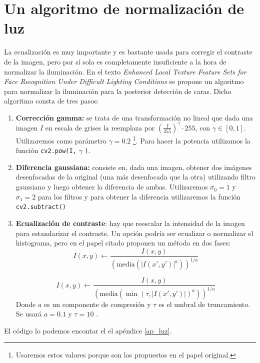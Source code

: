 \documentclass[a4paper,openright, 12pt]{book}
\begin{document}
\section{Un algoritmo de normalización de luz}
La ecualización es muy importante y es bastante usada para corregir el contraste de la imagen, pero por sí sola es completamente insuficiente a la hora de normalizar la iluminación. En el texto \textit{Enhanced Local Texture Feature Sets for Face Recognition Under Difficult Lighting Conditions} \cite{illuFace} se propone un algoritmo para normalizar la iluminación para la posterior detección de caras.
\newline
Dicho algoritmo consta de tres pasos:
\begin{enumerate}
\item \textbf{Corrección gamma:} 
se trata de una transformación no lineal que dada una imagen $I$ en escala de grises la reemplaza por ${(\frac{I}{255})}^{\gamma}\cdot255$, con $\gamma \in [0,1]$. Utilizaremos como parámetro $\gamma = 0.2$ \footnote{Usaremos estos valores porque son los propuestos en el papel original.}. Para hacer la potencia utilizamos la función \lstinline|cv2.pow(I,| $\gamma$ \lstinline|)|.

\item \textbf{Diferencia gaussiana:} consiste en, dada una imagen, obtener dos imágenes desenfocadas de la original (una más desenfocada que la otra) utilizando filtro gaussiano y luego obtener la diferencia de ambas. Utilizaremos $\sigma_0 =1$ y $\sigma_1=2$ para los filtros y para obtener la diferencia utilizaremos la función \lstinline|cv2.subtract()|

\item \textbf{Ecualización de contraste}: hay que reescalar la intensidad de la imagen para estandarizar el contraste. Un opción podría ser ecualizar o normalizar el histograma, pero en el papel citado proponen un método en dos fases:
\begin{equation}
I(x,y) \leftarrow \frac{I(x,y)}{ {(\text{media}(|I(x',y')|^a))}^{1/a}}
\end{equation}

\begin{equation}
I(x,y) \leftarrow \frac{I(x,y)}{ {(\text{media}({\min(\tau, |I(x',y')|)}^a))}^{1/a}}
\end{equation}
Donde $a$ es un componente de compresión y $\tau$ es el umbral de truncamiento. Se usará $a=0.1$ y $\tau=10$ \footnotemark[\value{footnote}].
\end{enumerate}
El código lo podemos encontar el el apéndice \ref{ap_luz}.
\end{document}
